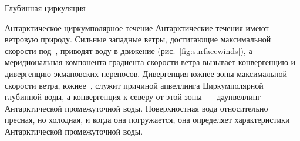 \begin{chapter}{Глубинная циркуляция}
\begin{section}{Антарктическое циркумполярное течение}
Антарктические течения имеют ветровую природу. Сильные западные ветры,
достигающие максимальной скорости под~, приводят воду
в движение (рис.~\ref{fig:surfacewinds}), а меридиональная компонента 
градиента скорости ветра вызывает конвергенцию и дивергенцию экмановских
переносов. Дивергенция южнее зоны максимальной
скорости ветра, южнее~, служит причиной апвеллинга%
 Циркумполярной глубинной
воды, а конвергенция к северу от этой зоны~--- даунвеллинг Антарктической
промежуточной воды. Поверхностная вода относительно пресная, но холодная,
и когда она погружается, она определяет характеристики Антарктической
промежуточной воды.
%


\end{section}
\end{chapter}

